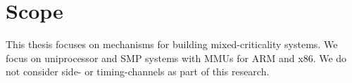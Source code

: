 \section{Scope}

This thesis focuses on mechanisms for building mixed-criticality systems. 
We focus on uniprocessor and \gls{SMP} systems with \glspl{MMU} for ARM and x86.
We do not consider side- or timing-channels as part of this research.
